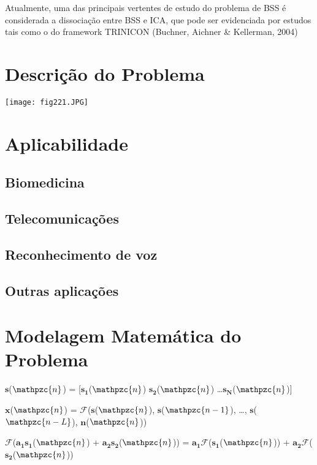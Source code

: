     
    Atualmente, uma das principais vertentes de estudo do problema de BSS é considerada a dissociação entre BSS e ICA, que pode ser evidenciada por estudos tais como o do framework TRINICON (Buchner, Aichner \& Kellerman, 2004)
    
\section{Descrição do Problema}

\begin{center}
\texttt{[image: fig221.JPG]}
\end{center}


\section{Aplicabilidade}
\subsection{Biomedicina}
\subsection{Telecomunicações}
\subsection{Reconhecimento de voz}
\subsection{Outras aplicações}

\section{Modelagem Matemática do Problema}

$\mathbf{s}$($\mathpzc{n}$) = [$\mathbf{s_1}$($\mathpzc{n}$) $\mathbf{s_2}$($\mathpzc{n}$) \dots  $\mathbf{s_N}$($\mathpzc{n}$)]

$\mathbf{x}$($\mathpzc{n}$) = $\mathcal{F}$($\mathbf{s}$($\mathpzc{n}$), $\mathbf{s}$($\mathpzc{n-1}$), \dots, $\mathbf{s}$($\mathpzc{n - L}$), $\mathbf{n}$($\mathpzc{n}$))

$\mathcal{F}$($\mathbf{a_1}$$\mathbf{s_1}$($\mathpzc{n}$) + $\mathbf{a_2}$$\mathbf{s_2}$($\mathpzc{n}$)) = $\mathbf{a_1}$$\mathcal{F}$($\mathbf{s_1}$($\mathpzc{n}$)) + $\mathbf{a_2}$$\mathcal{F}$($\mathbf{s_2}$($\mathpzc{n}$))

